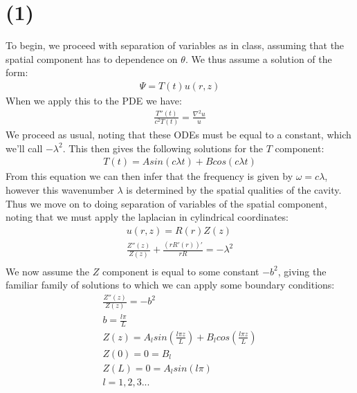 \documentclass{article}
\begin{document}
\section*{\textbf{(1)}}
To begin, we proceed with separation of variables as in class, assuming that the spatial component has to dependence on $\theta$. We thus assume a solution of the form:
\begin{equation}
\begin{aligned}
\Psi = T(t)u(r,z)
\end{aligned}
\end{equation}
When we apply this to the PDE we have:
\begin{equation}
\begin{aligned}
\frac{T''(t)}{c^2T(t)} = \frac{\nabla^2u}{u}
\end{aligned}
\end{equation}
We proceed as usual, noting that these ODEs must be equal to a constant, which we'll call $-\lambda^2$. This then gives the following solutions for the $T$ component:
\begin{equation}
\begin{aligned}
T(t) = Asin(c\lambda t) + Bcos(c\lambda t)
\end{aligned}
\end{equation}
From this equation we can then infer that the frequency is given by $\omega = c\lambda$, however this wavenumber $\lambda$ is determined by the spatial qualities of the cavity. Thus we move on to doing separation of variables of the spatial component, noting that we must apply the laplacian in cylindrical coordinates:
\begin{equation}
\begin{aligned}
u(r,z) = R(r)Z(z)\\
\frac{Z''(z)}{Z(z)} + \frac{(rR'(r))'}{rR} = -\lambda^2\\ 
\end{aligned}
\end{equation}
We now assume the $Z$ component is equal to some constant $-b^2$, giving the familiar family of solutions to which we can apply some boundary conditions:
\begin{equation}
\begin{aligned}
\frac{Z''(z)}{Z(z)} = -b^2\\
b = \frac{l\pi}{L}\\
Z(z) = A_lsin(\frac{l\pi z}{L}) + B_lcos(\frac{l \pi z}{L})\\
Z(0) = 0 = B_l\\
Z(L) = 0 = A_lsin(l\pi)\\
l = 1,2,3...
\end{aligned}
\end{equation}
\end{document}
